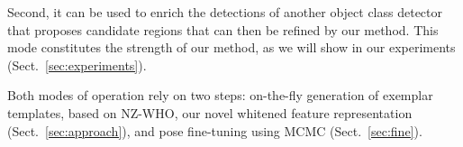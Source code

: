 Second, it can be used to enrich the detections of another object
class detector that proposes candidate regions that can then be
refined by our method. This mode constitutes the
strength of our method, as we will show in our experiments
(Sect.~\ref{sec:experiments}).

Both modes of operation rely on two steps:
on-the-fly generation of exemplar templates, based on NZ-WHO, our novel whitened
feature representation (Sect.~\ref{sec:approach}), and
pose fine-tuning using MCMC (Sect.~\ref{sec:fine}).




















